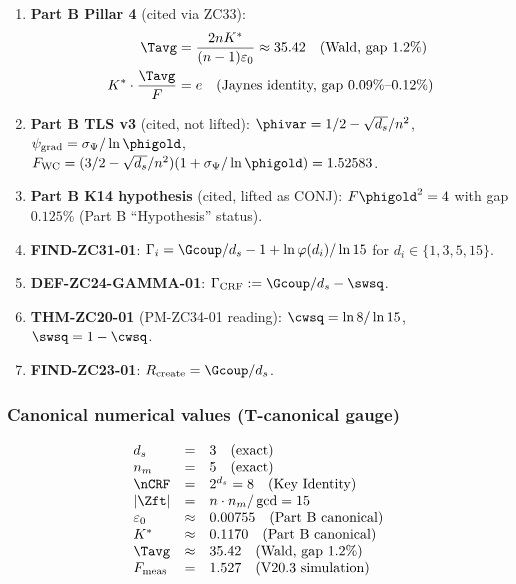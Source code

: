 \documentclass[12pt, a4paper]{article}
\begin{document}
\begin{keybox}[title={Inputs used by ZC36}]
\begin{enumerate}[leftmargin=*, noitemsep]
  \item \textbf{Part B Pillar 4} (cited via ZC33):
        \begin{align*}
          \Tavg &= \frac{2nK^*}{(n-1)\varepsilon_0}
            \approx 35.42 \quad\text{(Wald, gap $1.2\%$)} \\
          K^*\cdot\frac{\Tavg}{F} &= e
            \quad\text{(Jaynes identity, gap $0.09\%$--$0.12\%$)}
        \end{align*}
  \item \textbf{Part B TLS v3} (cited, not lifted):
        $\phivar = 1/2 - \sqrt{d_s}/n^2$,
        $\psi_{\rm grad} = \sigma_\Psi/\ln\phigold$,
        $F_{\rm WC} = (3/2 - \sqrt{d_s}/n^2)(1 + \sigma_\Psi/\ln\phigold) = 1.52583$.
  \item \textbf{Part B K14 hypothesis} (cited, lifted as CONJ):
        $F\phigold^2 = 4$ with gap $0.125\%$ (Part B
        ``Hypothesis'' status).
  \item \textbf{FIND-ZC31-01}: $\Gamma_i = \Gcoup/d_s - 1 +
        \ln\varphi(d_i)/\ln 15$ for $d_i \in \{1,3,5,15\}$.
  \item \textbf{DEF-ZC24-GAMMA-01}: $\Gamma_{\rm CRF} :=
        \Gcoup/d_s - \swsq$.
  \item \textbf{THM-ZC20-01} (PM-ZC34-01 reading):
        $\cwsq = \ln 8/\ln 15$, $\swsq = 1 - \cwsq$.
  \item \textbf{FIND-ZC23-01}: $R_{\rm create} = \Gcoup/d_s$.
\end{enumerate}
\end{keybox}

\subsubsection{Canonical numerical values (T-canonical gauge)}

\[
\begin{array}{l@{\quad}c@{\quad}l}
  d_s &=& 3 \quad (\text{exact})\\
  n_m &=& 5 \quad (\text{exact})\\
  \nCRF &=& 2^{d_s} = 8 \quad (\text{Key Identity})\\
  |\Zft| &=& n \cdot n_m / \gcd = 15\\
  \varepsilon_0 &\approx& 0.00755 \quad (\text{Part B canonical})\\
  K^* &\approx& 0.1170 \quad (\text{Part B canonical})\\
  \Tavg &\approx& 35.42 \quad (\text{Wald, gap $1.2\%$})\\
  F_{\rm meas} &=& 1.527 \quad (\text{V20.3 simulation})
\end{array}
\]
\end{document}

